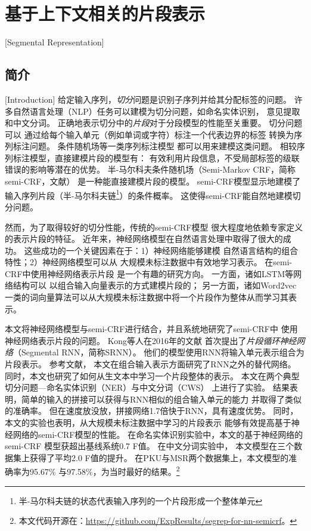 \chapter{基于上下文相关的片段表示}[Segmental Representation]\label{chp:semicrf}

\section{简介}[Introduction]
给定输入序列，\textit{切分}问题是识别子序列并给其分配标签的问题。
许多自然语言处理（NLP）任务可以建模为切分问题，如命名实体识别\cite{okanohara-EtAl:2006:COLACL}，
意见提取\cite{yang-cardie:2012:EMNLP-CoNLL}和中文分词\cite{andrew:2006:EMNLP}。
正确地表示切分中的\textit{片段}对于分段模型的性能至关重要。
切分问题可以
通过给每个输入单元（例如单词或字符）标注一个代表边界的标签
转换为序列标注问题。
条件随机场\cite{Lafferty:2001:CRF:645530.655813}等一类序列标注模型
都可以用来建模这类问题。
相较序列标注模型，直接建模片段的模型有：
有效利用片段信息，不受局部标签的级联错误的影响等潜在的优势。
半-马尔科夫条件随机场（Semi-Markov CRF，简称semi-CRF，文献）
是一种能直接建模片段的模型。
semi-CRF模型显示地建模了输入序列片段（半-马尔科夫链\footnote{半-马尔科夫链的状态代表输入序列的一个片段形成一个整体单元}）的条件概率。
这使得semi-CRF能自然地建模切分问题。

然而，为了取得较好的切分性能，传统的semi-CRF模型
很大程度地依赖专家定义的表示片段的特征。
近年来，神经网络模型在自然语言处理中取得了很大的成功。
这些成功的一个关键因素在于：1）神经网络能够建模
自然语言结构的组合特性；2）神经网络模型可以从
大规模未标注数据中有效地学习表示。
在semi-CRF中使用神经网络表示片段
是一个有趣的研究方向。
一方面，诸如LSTM\cite{Hochreiter:1997:LSM:1246443.1246450}等网络结构可以
以组合输入向量表示的方式建模片段的；
另一方面，诸如Word2vec\cite{DBLP:journals/corr/MikolovSCCD13}
一类的词向量算法可以从大规模未标注数据中将一个片段作为整体从而学习其表示。

本文将神经网络模型与semi-CRF进行结合，并且系统地研究了semi-CRF中
使用神经网络表示片段的问题。
Kong等人在2016年的文献
首次提出了\textit{片段循环神经网络}（Segmental RNN，简称SRNN）。
他们的模型使用RNN将输入单元表示组合为片段表示。
参考文献，
本文在组合输入表示方面研究了RNN之外的替代网络。
同时，本文也研究了如何从生文本中学习一个片段整体的表示。
本文在两个典型切分问题---命名实体识别（NER）与中文分词（CWS）
上进行了实验。
结果表明，简单的输入的拼接可以获得与RNN相似的组合输入单元的能力
并取得了类似的准确率。
但在速度放没放，拼接网络1.7倍快于RNN，具有速度优势。
同时，本文的实验也表明，从大规模未标注数据中学习的片段表示
能够有效提高基于神经网络的semi-CRF模型的性能。
在命名实体识别实验中，本文的基于神经网络的semi-CRF
模型获超出基线系统0.7 F值。
在中文分词实验中，
本文模型在三个数据集上获得了平均2.0 F值的提升。
在PKU与MSR两个数据集上，本文模型的准确率为95.67\%
与97.58\%，为当时最好的结果。\footnote{本文代码开源在：\url{https://github.com/ExpResults/segrep-for-nn-semicrf}。}

